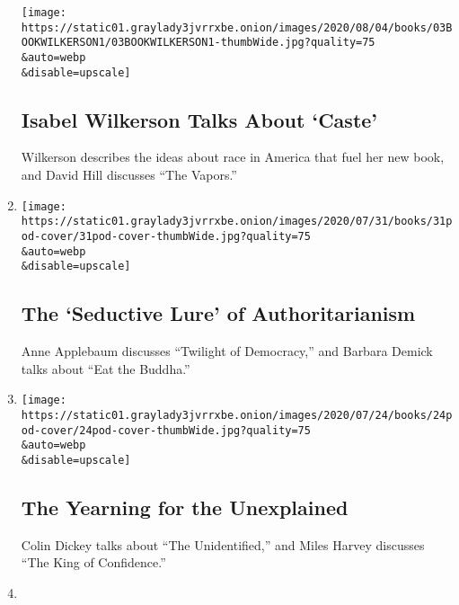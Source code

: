 \begin{enumerate}
  \texttt{[image: https://static01.graylady3jvrrxbe.onion/images/2020/08/04/books/03BOOKWILKERSON1/03BOOKWILKERSON1-thumbWide.jpg?quality=75\\\&auto=webp\\\&disable=upscale]}

  \hypertarget{isabel-wilkerson-talks-about-caste}{%
  \subsection{Isabel Wilkerson Talks About
  `Caste'}\label{isabel-wilkerson-talks-about-caste}}

  Wilkerson describes the ideas about race in America that fuel her new
  book, and David Hill discusses ``The Vapors.''
\item
  \href{/2020/07/31/books/review/podcast-twilight-democracy-anne-applebaum-eat-buddha-barbara-demick.html}{}

  \texttt{[image: https://static01.graylady3jvrrxbe.onion/images/2020/07/31/books/31pod-cover/31pod-cover-thumbWide.jpg?quality=75\\\&auto=webp\\\&disable=upscale]}

  \hypertarget{the-seductive-lure-of-authoritarianism}{%
  \subsection{The `Seductive Lure' of
  Authoritarianism}\label{the-seductive-lure-of-authoritarianism}}

  Anne Applebaum discusses ``Twilight of Democracy,'' and Barbara Demick
  talks about ``Eat the Buddha.''
\item
  \href{/2020/07/24/books/review/podcast-colin-dickey-unexplained-miles-harvey-king-of-confidence.html}{}

  \texttt{[image: https://static01.graylady3jvrrxbe.onion/images/2020/07/24/books/24pod-cover/24pod-cover-thumbWide.jpg?quality=75\\\&auto=webp\\\&disable=upscale]}

  \hypertarget{the-yearning-for-the-unexplained}{%
  \subsection{The Yearning for the
  Unexplained}\label{the-yearning-for-the-unexplained}}

  Colin Dickey talks about ``The Unidentified,'' and Miles Harvey
  discusses ``The King of Confidence.''
\item
  \href{/2020/07/17/books/review/podcast-julian-zelizer-burning-down-house-newt-gingrich-notes-silencing-lacy-crawford.html}{}


\end{enumerate}
